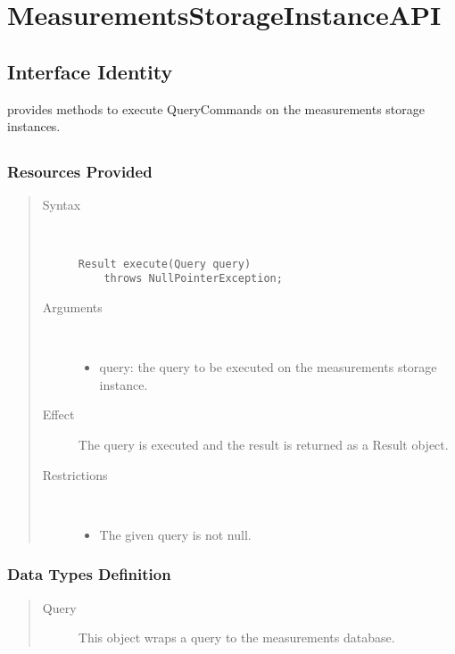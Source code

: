 \section{MeasurementsStorageInstanceAPI}

\subsection{Interface Identity}

\npar {} provides methods to execute
QueryCommands on the measurements storage instances.

\subsection{}

\subsubsection{Resources Provided}

\begin{quote}
	\begin{description}
		\item[Syntax] \ 
		\begin{verbatim}
Result execute(Query query) 
    throws NullPointerException;
		\end{verbatim}
		\item[Arguments] \
		\begin{itemize}
			\item query: the query to be executed on the measurements storage instance. 
		\end{itemize}
		\item[Effect] The query is executed and the result is returned as a Result
		object.
		\item[Restrictions] \ 
		\begin{itemize}
			\item The given query is not null.
		\end{itemize}
	\end{description} 
\end{quote}

\subsubsection{Data Types Definition}

\begin{quote}
	\begin{description}
		\item[Query] This object wraps a query to the measurements database.
	\end{description} 
\end{quote}

